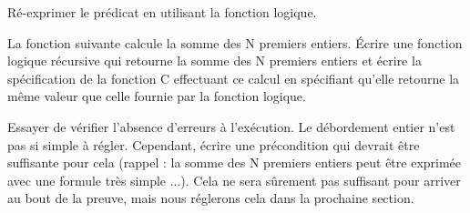 

Ré-exprimer le prédicat  en utilisant la fonction logique.




\label{l4:acsl-properties-functions-n-first-ints}


La fonction suivante calcule la somme des N premiers entiers. Écrire une fonction
logique récursive qui retourne la somme des N premiers entiers et écrire
la spécification de la fonction C effectuant ce calcul en spécifiant qu'elle
retourne la même valeur que celle fournie par la fonction logique.




Essayer de vérifier l'absence d'erreurs à l'exécution. Le débordement entier
n'est pas si simple à régler. Cependant, écrire une précondition qui devrait
être suffisante pour cela (rappel : la somme des N premiers entiers peut être
exprimée avec une formule très simple ...). Cela ne sera sûrement pas suffisant
pour arriver au bout de la preuve, mais nous réglerons cela dans la prochaine
section.


